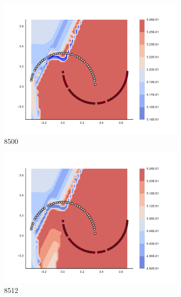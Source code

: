 \begin{figure}[h]
\begin{subfigure}[b]{0.09\textwidth}
    \includegraphics[clip, trim=2.35cm 1.75cm 4.5cm 0cm,width=\textwidth]{img/convergence/8500.pdf}
    \caption{8500}
    \label{fig:convergence_8500}
\end{subfigure}
%
\begin{subfigure}[b]{0.09\textwidth}
    \includegraphics[clip, trim=2.35cm 1.75cm 4.5cm 0cm,width=\textwidth]{img/convergence/8512.pdf}
    \caption{8512}
    \label{fig:convergence_8512}
\end{subfigure}
%
\begin{subfigure}[b]{0.09\textwidth}

\end{subfigure}
\end{figure}
